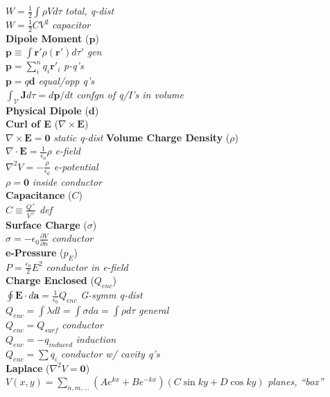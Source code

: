 \documentclass[9pt]{extarticle}
\begin{document}
\begin{multicols}{3}
$W = \frac{1}{2}\int\rho Vd\tau$ \textit{total, q-dist} \\
$W = \frac{1}{2}CV^{2}$ \textit{capacitor} \\
\textbf{Dipole Moment} ($\mathbf{p}$) \\
$\mathbf{p} \equiv \int{\mathbf{r}' \rho(\mathbf{r}') d\tau'}$ \textit{gen} \\
$\mathbf{p} = \sum_{i}^{n}q_{i}\mathbf{r'}_{i}$ \textit{p-q's} \\
$\mathbf{p} = q\mathbf{d}$ \textit{equal/opp q's} \\
$\int_{\mathcal{V}} \mathbf{J}d\tau = d\mathbf{p}/dt$ \textit{confgn of q/I's in volume} \\
\textbf{Physical Dipole} ($\mathbf{d}$) \\
\textbf{Curl of E} ($\nabla\times\mathbf{E}$)\\
$\nabla\times\mathbf{E} = \mathbf{0}$ \textit{static q-dist}
\textbf{Volume Charge Density} ($\rho$) \\
$\nabla\cdot\mathbf{E} = \frac{1}{\epsilon_{0}}\rho$ \textit{e-field} \\
$\nabla^{2}V = -\frac{\rho}{\epsilon_{0}}$ \textit{e-potential} \\
$\rho = \mathbf{0}$ \textit{inside conductor} \\
\textbf{Capacitance} ($C$) \\
$C \equiv \frac{Q^{+}}{V^{+}}$ \textit{def} \\
\textbf{Surface Charge} ($\sigma$) \\
$\sigma = -\epsilon_{0}\frac{\partial V}{\partial n}$ \textit{conductor} \\
\textbf{e-Pressure} ($p_{E}$) \\
$P = \frac{\epsilon_{0}}{2}E^{2}$ \textit{conductor in e-field} \\
\textbf{Charge Enclosed} ($Q_{enc}$) \\
$\oint\mathbf{E}\cdot d\mathbf{a} = \frac{1}{\epsilon_{0}}Q_{enc}$ \textit{G-symm q-dist} \\
$Q_{enc} = \int\lambda dl = \int\sigma da = \int\rho d\tau$ \textit{general} \\
$Q_{enc} = Q_{surf}$ \textit{conductor} \\
$Q_{enc} = -q_{induced}$ \textit{induction} \\
$Q_{enc} = \sum q_{i}$ \textit{conductor w/ cavity q's} \\
\textbf{Laplace} ($\nabla^{2}V = \mathbf{0}$) \\
$V(x, y) = \sum_{n,m,\ldots}(Ae^{kx} + Be^{-kx})(C\sin{ky} + D\cos{ky})$  \textit{planes, ``box''} \\

\end{multicols}
\end{document}
